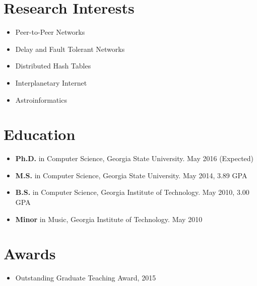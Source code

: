 \documentclass{res}
\begin{document}
\begin{resume} 

\section{Research Interests}
	\begin{itemize}
    \item Peer-to-Peer Networks
	\item Delay and Fault Tolerant Networks
	\item Distributed Hash Tables
	\item Interplanetary Internet 
	\item Astroinformatics
	
	\end{itemize}
\section{Education}          
    \begin{itemize}    
    \item {\bf Ph.D.} in Computer Science, Georgia State University. May 2016 (Expected)
    \item {\bf M.S.} in Computer Science, Georgia State University. May 2014, 3.89 GPA 
    \item {\bf B.S.} in Computer Science, Georgia Institute of Technology. May 2010, 3.00 GPA
	\item {\bf Minor} in Music, Georgia Institute of Technology. May 2010
    
    \end{itemize}   

\section{Awards}
	\begin{itemize}    
		\item Outstanding Graduate Teaching Award, 2015
	\end{itemize}   


\end{resume}
\end{document}
